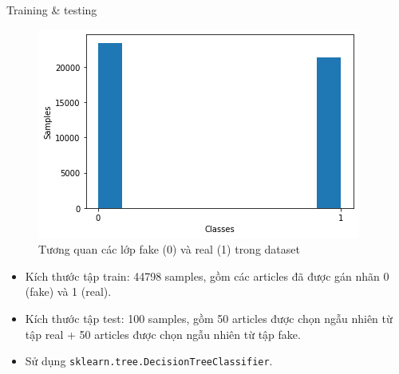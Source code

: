 \documentclass[aspectratio=169,xcolor=dvipsnames]{beamer}
\begin{document}
\begin{frame}{Training \& testing}
\begin{figure}[H]
	\centering
	\includegraphics[scale=.4]{img/data-summerise.png}
	\caption{Tương quan các lớp fake (0) và real (1) trong dataset}
\end{figure}
\begin{itemize}
\item Kích thước tập train: 44798 samples, gồm các articles đã được gán nhãn 0 (fake) và 1 (real).
\item Kích thước tập test: 100 samples, gồm 50 articles được chọn ngẫu nhiên từ tập real + 50 articles được chọn ngẫu nhiên từ tập fake.
\item Sử dụng \texttt{sklearn.tree.DecisionTreeClassifier}.
\end{itemize}
\end{frame}
\end{document}
